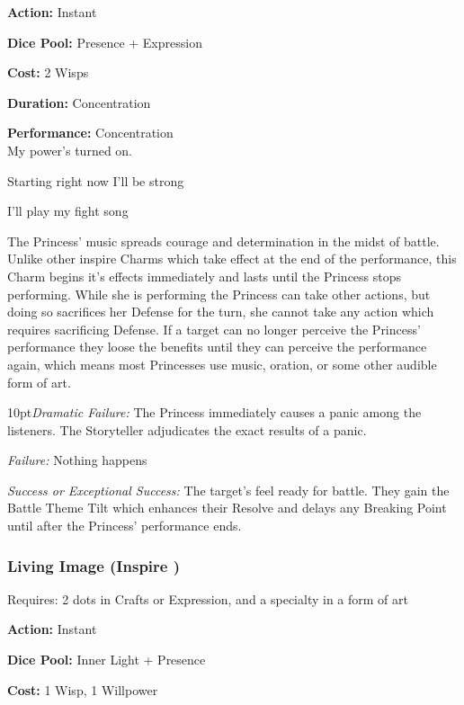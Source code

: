 \noindent \textbf{Action:} Instant

\noindent \textbf{Dice Pool:} Presence + Expression

\noindent \textbf{Cost:} 2 Wisps

\noindent \textbf{Duration:} Concentration

\noindent \textbf{Performance:} Concentration\\

\noindent My power's turned on.

Starting right now I'll be strong

I'll play my fight song

The Princess' music spreads courage and determination in the midst of battle. Unlike other inspire Charms which take effect at the end of the performance, this Charm begins it's effects immediately and lasts until the Princess stops performing. While she is performing the Princess can take other actions, but doing so sacrifices her Defense for the turn, she cannot take any action which requires sacrificing Defense. If a target can no longer perceive the Princess' performance they loose the benefits until they can perceive the performance again, which means most Princesses use music, oration, or some other audible form of art. 

\begin{myindentpar}{10pt}\emph{Dramatic Failure:} The Princess immediately causes a panic among the listeners. The Storyteller adjudicates the exact results of a panic. 
 
 \emph{Failure:} Nothing happens
 
 \emph{Success or Exceptional Success:} The target's feel ready for battle. They gain the Battle Theme Tilt which enhances their Resolve and delays any Breaking Point until after the Princess' performance ends.  
 
 \end{myindentpar}

\subsubsection*{Living Image (Inspire \textbullet)}

\noindent Requires: 2 dots in Crafts or Expression, and a specialty in a form of art

\noindent \textbf{Action:} Instant

\noindent \textbf{Dice Pool:} Inner Light + Presence 

\noindent \textbf{Cost:} 1 Wisp, 1 Willpower


